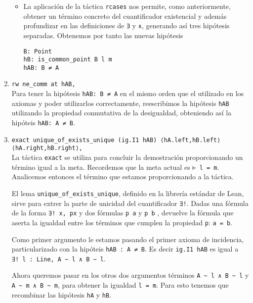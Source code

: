 \begin{enumerate}[label=L.\arabic*, topsep=0mm]
\begin{itemize}
		      \item La aplicación de la táctica \lstinline{rcases} nos permite, como
		            anteriormente, obtener un término concreto del cuantificador
		            existencial y además profundizar en las definiciones de
		            \lstinline{∃} y \lstinline{∧}, generando así tres hipótesis
		            separadas. Obtenemos por tanto las nuevas hipótesis
		            \begin{lstlisting}
B: Point 
hB: is_common_point B l m 
hAB: B ≠ A
\end{lstlisting}
	      \end{itemize}

	\item \lstinline{rw ne_comm at hAB,}\\[.5em] Para tener la hipótesis
	      \lstinline{hAB: B ≠ A} en el mismo orden que el utilizado en los axiomas y
	      poder utilizarlos correctamente, reescribimos la hipótesis \lstinline{hAB}
	      utilizando la propiedad conmutativa de la desigualdad, obteniendo así la
	      hipóteis \lstinline{hAB: A ≠ B}.

	\item \lstinline{exact unique_of_exists_unique (ig.I1 hAB) ⟨hA.left,hB.left⟩ ⟨hA.right,hB.right⟩,}\\[.5em]
	      La táctica \lstinline{exact} se utiliza para concluir la demostración
	      proporcionando un término igual a la meta. Recordemos que la meta actual
	      es \lstinline{⊢ l = m}. Analicemos entonces el término que estamos proporcionando a la táctica.

	      El lema \lstinline{unique_of_exists_unique}, definido en la librería
	      estándar de Lean, sirve para extrer la parte de unicidad del cuantificador
	      \lstinline{∃!}. Dadas una fórmula de la forma \lstinline{∃! x, px} y dos
	      fórmulas \lstinline{p a} y \lstinline{p b} , devuelve la fórmula que
	      aserta la igualdad entre los términos que cumplen la propiedad
	      \lstinline{p}: \lstinline{a = b}.

	      Como primer argumento le estamos pasando el primer axioma de incidencia,
	      particularizado con la hipóteis \lstinline{hAB : A ≠ B}. Es decir
	      \lstinline{ig.I1 hAB} es igual a\\ \lstinline{∃! l : Line, A ~ l ∧ B ~ l}.

	      Ahora queremos pasar en los otros dos argumentos términos
	      \lstinline{A ~ l ∧ B ~ l} y \lstinline{A ~ m ∧ B ~ m}, para obtener la
	      igualdad \lstinline{l = m}. Para esto tenemos que recombinar las hipótesis
	      \lstinline{hA} y \lstinline{hB}.


\end{enumerate}
